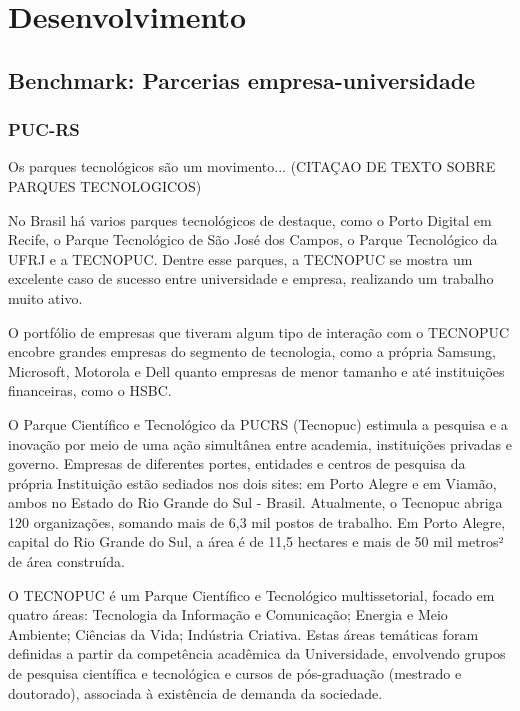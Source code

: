 \chapter{Desenvolvimento}
\label{cha:desenvolvimento}

\section{Benchmark: Parcerias empresa-universidade} %
\label{sec:cases}

\subsection{PUC-RS}

Os parques tecnológicos são um movimento... (CITAÇAO DE TEXTO SOBRE PARQUES TECNOLOGICOS)

No Brasil há varios parques tecnológicos de destaque, como o Porto Digital em Recife, o Parque Tecnológico de São José dos Campos, o Parque Tecnológico da UFRJ e a TECNOPUC. Dentre esse parques, a TECNOPUC se mostra um excelente caso de sucesso entre universidade e empresa, realizando um trabalho muito ativo.

O portfólio de empresas que tiveram algum tipo de interação com o TECNOPUC encobre grandes empresas do segmento de tecnologia, como a própria Samsung, Microsoft, Motorola e Dell quanto empresas de menor tamanho e até instituições financeiras, como o HSBC.

O Parque Científico e Tecnológico da PUCRS (Tecnopuc) estimula a pesquisa e a inovação por meio de uma ação simultânea entre academia, instituições privadas e governo. Empresas de diferentes portes, entidades e centros de pesquisa da própria Instituição estão sediados nos dois sites: em Porto Alegre e em Viamão, ambos no Estado do Rio Grande do Sul - Brasil. Atualmente, o Tecnopuc abriga 120 organizações, somando mais de 6,3 mil postos de trabalho. Em Porto Alegre, capital do Rio Grande do Sul, a área é de 11,5 hectares e mais de 50 mil metros² de área construída.

O TECNOPUC é um Parque Científico e Tecnológico multissetorial, focado em quatro áreas:
Tecnologia da Informação e Comunicação;
Energia e Meio Ambiente;
Ciências da Vida;
Indústria Criativa.
Estas áreas temáticas foram definidas a partir da competência acadêmica da Universidade, envolvendo grupos de pesquisa científica e tecnológica e cursos de pós-graduação (mestrado e doutorado), associada à existência de demanda da sociedade. 


